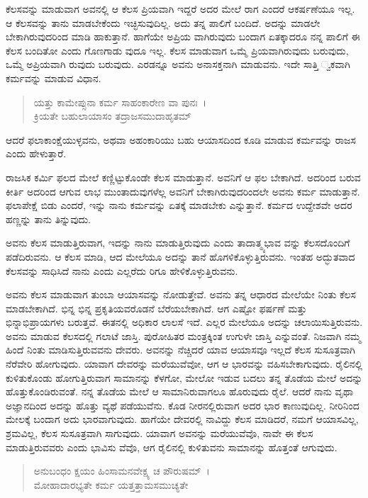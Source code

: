 ಕೆಲಸವನ್ನು ಮಾಡುವಾಗ ಅವನಲ್ಲಿ ಆ ಕೆಲಸ ಪ್ರಿಯವಾಗಿ ಇದ್ದರೆ ಅದರ ಮೇಲೆ ರಾಗ ಎಂದರೆ ಆಕರ್ಷಣೆಯೂ ಇಲ್ಲ. ಆ ಕೆಲಸವನ್ನು ತಾನು ಮಾಡಬೇಕೆಂದು ಇಚ್ಛಿಸುವುದಿಲ್ಲ. ಅದು ತನ್ನ ಪಾಲಿಗೆ ಬಂದಿದೆ. ಅದನ್ನು ಮಾಡಲೇ ಬೇಕಾಗಿರುವುದರಿಂದ ಮಾಡಿ ಹಾಕುತ್ತಾನೆ. ಹಾಗೆಯೇ ಅಪ್ರಿಯ ವಾಗಿರುವುದು ಬಂದಾಗ ಏತಕ್ಕಾದರೂ ನನ್ನ ಪಾಲಿಗೆ ಈ ಕೆಲಸ ಬಂದಿತೋ ಎಂದು ಗೊಣಗಾಡು ವುದೂ ಇಲ್ಲ. ಕೆಲಸ ಮಾಡುವಾಗ ಒಮ್ಮೆ ಪ್ರಿಯವಾಗಿರುವುದು ಬರುವುದು, ಒಮ್ಮೆ ಅಪ್ರಿಯವಾಗಿ ರುವುದು ಬರುವುದು. ಎರಡನ್ನೂ ಅವನು ಅನಾಸಕ್ತನಾಗಿ ಮಾಡುವನು. ಇದೇ ಸಾತ್ತಿ ್ವಕವಾಗಿ ಕರ್ಮವನ್ನು ಮಾಡುವ ವಿಧಾನ.

\begin{verse}
ಯತ್ತು ಕಾಮೇಪ್ಸುನಾ ಕರ್ಮ ಸಾಹಂಕಾರೇಣ ವಾ ಪುನಃ~।\\ಕ್ರಿಯತೇ ಬಹುಲಾಯಾಸಂ ತದ್ರಾಜಸಮುದಾಹೃತಮ್ 
\end{verse}

{\small ಆದರೆ ಫಲಾಕಾಂಕ್ಷೆಯುಳ್ಳವನು, ಅಥವಾ ಅಹಂಕಾರಿಯು ಬಹು ಆಯಾಸದಿಂದ ಕೂಡಿ ಮಾಡುವ ಕರ್ಮವನ್ನು ರಾಜಸ ಎಂದು ಹೇಳುತ್ತಾರೆ.}

ರಾಜಸಿಕ ಕರ್ಮಿ ಫಲದ ಮೇಲೆ ಕಣ್ಣಿಟ್ಟುಕೊಂಡೇ ಕೆಲಸ ಮಾಡುತ್ತಾನೆ. ಅವನಿಗೆ ಆ ಫಲ ಬೇಕಾಗಿದೆ. ಅದರಿಂದ ಬರುವ ಕೀರ್ತಿ ಅದರಿಂದ ಆಗುವ ಲಾಭ ಮುಂತಾದುವುಗಳೆಲ್ಲ ಅವನಿಗೆ ಬೇಕಾಗಿರುವುದರಿಂದಲೇ ಅವನು ಕರ್ಮ ಮಾಡುತ್ತಾನೆ. ಫಲಾಪೇಕ್ಷೆ ಬಿಡು ಎಂದರೆ, ಇನ್ನು ನಾನು ಕರ್ಮವನ್ನು ಏತಕ್ಕೆ ಮಾಡಬೇಕು ಎನ್ನುತ್ತಾನೆ. ಕರ್ಮದ ಉದ್ದೇಶವೇ ಅದರ ಹಣ್ಣನ್ನು ತಾನು ತಿನ್ನುವುದು.

ಅವನು ಕೆಲಸ ಮಾಡುತ್ತಿರುವಾಗ, ಇದನ್ನು ನಾನು ಮಾಡುತ್ತಿರುವುದು ಎಂದು ತಾದಾತ್ಮ್ಯಭಾವ ವನ್ನು ಕೆಲಸದೊಂದಿಗೆ ಪಡೆದಿರುವನು. ಆ ಕೆಲಸ ಮಾಡಿ, ಆದ ಮೇಲೆಯೂ ಅದನ್ನು ತಾನೆ ಹೊಗಳಿಕೊಳ್ಳುತ್ತಿರುವನು. ಇಂತಹ ಅದ್ಭುತವಾದ ಕೆಲಸವನ್ನು ಸಾಧಿಸಿದೆ ನಾನು ಎಂದು ಎಲ್ಲರೆದು ರಿಗೂ ಹೇಳಿಕೊಳ್ಳುತ್ತಿರುವನು.

ಅವನು ಕೆಲಸ ಮಾಡುವಾಗ ತುಂಬಾ ಆಯಾಸವನ್ನು ನೋಡುತ್ತೇವೆ. ಅವನು ತನ್ನ ಆಧಾರದ ಮೇಲೆಯೇ ನಿಂತು ಕೆಲಸ ಮಾಡಬೇಕಾಗಿದೆ. ಭಿನ್ನ ಭಿನ್ನ ಪ್ರಕೃತಿಯವರೊಡನೆ ಬೆರೆಯಬೇಕಾಗಿದೆ. ಆಗ ಎಷ್ಟೋ ಫರ್ಷಣೆ ಮತ್ತು ಭಿನ್ನಾಭಿಪ್ರಾಯಗಳು ಬರುತ್ತವೆ. ಈತನಲ್ಲಿ ಅಧಿಕಾರ ಲಾಲಸೆ ಇದೆ. ಎಲ್ಲರ ಮೇಲೆಯೂ ಅದನ್ನು ಚಲಾಯಿಸುತ್ತಿರುವನು. ಅವನು ಮಾಡುವ ಕೆಲಸದಲ್ಲಿ ಗಲಾಟೆ ಜಾಸ್ತಿ. ಪುರೋಹಿತರ ಮಂತ್ರಕ್ಕಿಂತ ಉಗುಳೇ ಜಾಸ್ತಿ ಎನ್ನುವಂತೆ. ನಿಜವಾಗಿ ನಮ್ಮ ಹಿಂದೆ ನಿಂತು ಮಾಡಿಸುತ್ತಿರುವವನು ದೇವರು. ಅವನನ್ನು ನೆಚ್ಚಿದರೆ ಯಾವ ಆಯಾಸವೂ ಇಲ್ಲದೆ ಕೆಲಸ ಸುಸೂತ್ರವಾಗಿ ನೆರೆವೇರಿ ಹೋಗುವುದು. ಯಾವಾಗ ದೇವರನ್ನು ಮರೆಯುವೆವೋ, ಆಗ ಆ ಭಾರವನ್ನು ವಹಿಸಬೇಕಾಗುವುದು. ರೈಲಿನಲ್ಲಿ ಕುಳಿತುಕೊಂಡು ಹೋಗುತ್ತಿರುವಾಗ ಸಾಮಾನನ್ನು ಕೆಳಗೋ, ಮೇಲೋ ಇಡುವ ಬದಲು ತನ್ನ ತೊಡೆಯ ಮೇಲೆ ಅದನ್ನು ಹೊತ್ತುಕೊಂಡಿರುವಂತೆ. ನನ್ನ ತೊಡೆಯ ಮೇಲೆ ಆ ಸಾಮಾನಿರುವಾಗಲೂ ಹೊರುವುದು ರೈಲೆ. ಆದರೆ ನಾನು ವೃಥಾ ಅಜ್ಞಾನದಿಂದ ಅದನ್ನು ಹೊತ್ತು ವ್ಯಥೆ ಪಡೆಯುವೆನು. ಕೊಡ ನೀರನಲ್ಲಿರುವಾಗ ಅದರ ಭಾರ ಕಾಣುವುದಿಲ್ಲ. ನೀರಿನಿಂದ ಮೇಲಕ್ಕೆ ಬಂದಾಗ ಅದು ಭಾರವಾಗುವುದು. ಹಾಗೆಯೇ ದೇವರಲ್ಲಿ ನಾವಿದ್ದು ಕೆಲಸ ಮಾಡಿದರೆ, ನಮಗೆ ಆಯಾಸವಿಲ್ಲ, ಶ್ರಮವಿಲ್ಲ, ಕೆಲಸ ಸುಸೂತ್ರವಾಗಿ ಸಾಗುವುದು. ಯಾವಾಗ ಅವನನ್ನು ಮರೆಯುವೆವೊ, ನಾವೇ ಈ ಕೆಲಸ ಮಾಡುತ್ತಿರುವವರು ಎಂದು ಭಾವಿಸು ವೆವೊ, ಆಗ ರೈಲಿನಲ್ಲಿ ಕುಳಿತುವನು ಸಾಮಾನನ್ನು ಹೊತ್ತಂತೆ ಆಗುವುದು.

\begin{verse}
ಅನುಬಂಧಂ ಕ್ಷಯಂ ಹಿಂಸಾಮನವೇಕ್ಷ್ಯ ಚ ಪೌರುಷಮ್~।\\ಮೋಹಾದಾರಭ್ಯತೇ ಕರ್ಮ ಯತ್ತತ್ತಾಮಸಮುಚ್ಯತೇ 
\end{verse}

